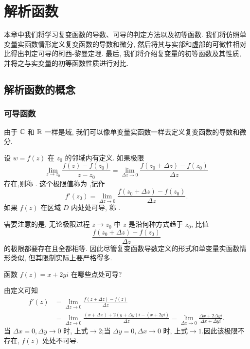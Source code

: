 
\chapter{解析函数}

\label{chapter:2}

本章中我们将学习复变函数的导数、可导的判定方法以及初等函数.
我们将仿照单变量实函数情形定义复变函数的导数和微分, 然后将其与实部和虚部的可微性相对比得出判定可导的柯西-黎曼定理.
最后, 我们将介绍复变量的初等函数及其性质, 并将之与实变量的初等函数性质进行对比.

\section{解析函数的概念}

\subsection{可导函数}

由于 ${\mathbb{C}}$ 和 ${\mathbb{R}}$ 一样是域, 我们可以像单变量实函数一样去定义复变函数的导数和微分.

\begin{definition}
  设 $w=f(z)$ 在 $z_0$ 的邻域内有定义.
  如果极限
  \[
     \lim_{z\to z_0}\frac{f(z)-f(z_0)}{z-z_0}
    =\lim_{\Delta z\to 0}\frac{f(z_0+\Delta z)-f(z_0)}{\Delta z}
  \]
  存在,则称 .
  这个极限值称为 ,记作
  \[
    f'(z_0)=\lim_{\Delta z\to 0}\frac{f(z_0+\Delta z)-f(z_0)}{\Delta z}.
  \]
  如果 $f(z)$ 在区域 $D$ 内处处可导, 称 .
\end{definition}

需要注意的是, 无论极限过程 $z\to z_0$ 中 $z$ 是沿何种方式趋于 $z_0$, 比值
\[
  \frac{f(z_0+\Delta z)-f(z_0)}{\Delta z}
\]
的极限都要存在且全都相等.
因此尽管复变函数导数定义的形式和单变量实函数情形类似, 但其限制实际上要严格得多.

\begin{example}
  函数 $f(z)=x+2yi$ 在哪些点处可导?
\end{example}

\begin{solution}
  由定义可知
  \begin{align*}
    f'(z)&=\lim_{\Delta z\to 0}\frac{f(z+\Delta z)-f(z)}{\Delta z}\\
    &=\lim_{\Delta z\to 0}\frac{(x+\Delta x)+2(y+\Delta y)i-(x+2yi)}{\Delta z}
    =\lim_{\Delta z\to 0}\frac{\Delta x+2\Delta y i}{\Delta x+\Delta yi}.
  \end{align*}
  当 $\Delta x=0, \Delta y\to 0$ 时, 上式$\to2$;当 $\Delta y=0, \Delta x\to 0$ 时, 上式$\to1$.因此该极限不存在, $f(z)$ 处处不可导.
\end{solution}

